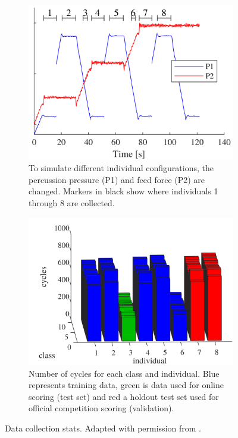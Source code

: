 \begin{figure}[!htb]
    \begin{center}
        \begin{subfigure}[t]{0.46\linewidth}
        \includegraphics[width=\linewidth]{figures/drill_5.png}
        \caption{To simulate different individual configurations, the percussion pressure (P1) and feed force (P2) are changed. Markers in black show where individuals 1 through 8 are collected.}
        \label{fig:phm_5}
    \end{subfigure}
    \hfill
    \begin{subfigure}[t]{0.51\linewidth}
        \includegraphics[width=\linewidth]{figures/drill_6.png}
        \caption{Number of cycles for each class and individual. Blue represents training data, green is data used for online scoring (test set) and red a holdout test set used for official competition scoring (validation).}
        \label{fig:phm_6}
    \end{subfigure}
    \caption{Data collection stats. Adapted with permission from \cite{jakobsson2022dataset}.}
    \label{fig:phm_5_6}
  \end{center}
  \vspace{-0em}
  \end{figure}



